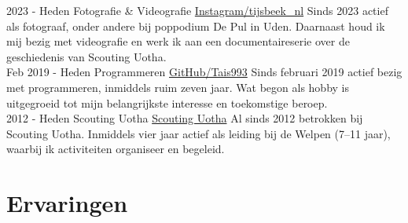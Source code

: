 \documentclass[letterpaper]{twentysecondcv_nederlands}
\begin{document}
\begin{twenty}

    \twentyitem
    {2023 -}
    {Heden}
    {Fotografie \& Videografie}
    {\href{https://www.instagram.com/tijsbeek_nl/}{Instagram/tijsbeek\_nl}}
    {}
    {
        Sinds 2023 actief als fotograaf, onder andere bij
        poppodium De Pul in Uden.
        Daarnaast houd ik mij bezig met videografie en werk
        ik aan een documentaireserie over de geschiedenis
        van Scouting Uotha.
    }\\

    \twentyitem
    {Feb 2019 -}
    {Heden}
    {Programmeren}
    {\href{https://github.com/Tais993}{GitHub/Tais993}}
    {}
    {
        Sinds februari 2019 actief bezig met programmeren,
        inmiddels ruim zeven jaar.
        Wat begon als hobby is uitgegroeid tot mijn
        belangrijkste interesse en toekomstige beroep.
    }\\

    \twentyitem
    {2012 -}
    {Heden}
    {Scouting Uotha}
    {\href{https://www.uotha.nl/}{Scouting Uotha}}
    {}
    {
        Al sinds 2012 betrokken bij Scouting Uotha.
        Inmiddels vier jaar actief als leiding bij de
        Welpen (7--11 jaar), waarbij ik activiteiten
        organiseer en begeleid.
    }

\end{twenty}

\vspace{6mm}


\section{Ervaringen}
\end{document}
